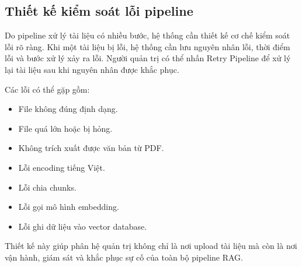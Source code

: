 \subsection{Thiết kế kiểm soát lỗi pipeline}

Do pipeline xử lý tài liệu có nhiều bước, hệ thống cần thiết kế cơ chế kiểm soát lỗi rõ ràng. Khi một tài liệu bị lỗi, hệ thống cần lưu nguyên nhân lỗi, thời điểm lỗi và bước xử lý xảy ra lỗi. Người quản trị có thể nhấn Retry Pipeline để xử lý lại tài liệu sau khi nguyên nhân được khắc phục.

Các lỗi có thể gặp gồm:

\begin{itemize}
    \item File không đúng định dạng.
    \item File quá lớn hoặc bị hỏng.
    \item Không trích xuất được văn bản từ PDF.
    \item Lỗi encoding tiếng Việt.
    \item Lỗi chia chunks.
    \item Lỗi gọi mô hình embedding.
    \item Lỗi ghi dữ liệu vào vector database.
\end{itemize}

Thiết kế này giúp phân hệ quản trị không chỉ là nơi upload tài liệu mà còn là nơi vận hành, giám sát và khắc phục sự cố của toàn bộ pipeline RAG.
